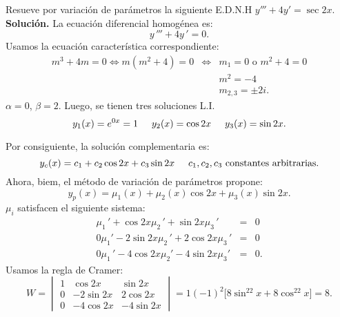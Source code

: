 \documentclass[9pt]{beamer}
\begin{document}
\begin{frame}[t]
	\begin{example}
		Resueve por variación de parámetros la siguiente E.D.N.H \(y''' +4y' = \sec 2x\). \\[2mm]
		\textbf{Solución.} La ecuación diferencial homogénea es:
		\[
			y\,''' +4y\,' = 0.
		\]
		Usamos la ecuación característica correspondiente:
		\[
			\begin{array}{rcl}
				m^3+4m = 0 \iff m(m^2+4) =0 & \iff & m_1 = 0 \mbox{ o } m^2+4=0\\[2mm]
				&& m^2 = -4 \\[2mm]
				&& m_{2,3} = \pm 2i.
			\end{array}
		\]
		\(\alpha =0\), \(\beta =2\). Luego, se tienen tres soluciones L.I.
		\[
			y_1(x) = e^{0x} = 1 \hspace{5mm} y_2(x) = \cos 2x \hspace{5mm} y_3(x) = \sin 2x.
		\]
	\end{example}
\end{frame}

\begin{frame}[t]
	\begin{exampleblock}{}
		Por consiguiente, la solución complementaria es:
		\[
			y_c(x) = c_1+c_2 \cos 2x+ c_3 \sin 2x \hspace{5mm} c_1,c_2,c_3\mbox{ constantes arbitrarias}.
		\]
		Ahora, biem, el método de variación de parámetros propone:
		\[
			y_p(x) = \mu _1(x) + \mu _2(x) \cos 2x + \mu _3(x) \sin 2x.
		\]
		\(\mu _i\) satisfacen el siguiente sistema:
		\[
			\begin{array}{rcl}
				\mu _1\,' + \cos 2x \mu _2\,' + \sin 2x \mu _3\,' & = & 0 \\[2mm]
				0 \mu _1' -2 \sin 2x \mu _2\,' + 2 \cos 2x \mu _3\,' & = & 0 \\[2mm]
				0 \mu _1\,' -4 \cos 2x \mu _2' -4 \sin 2x \mu _3' & = & 0.
			\end{array}
		\]
		Usamos la regla de Cramer:
		\[
			W = \begin{vmatrix}
				1 & \cos 2x & \sin 2x \\
				0 & -2 \sin 2x & 2 \cos 2x \\
				0 & -4 \cos 2x & -4 \sin 2x
			\end{vmatrix} = 1(-1) ^2 \big[8 \sin ^22x+8 \cos ^22x\big] = 8.
		\]
	\end{exampleblock}
\end{frame}
\end{document}
